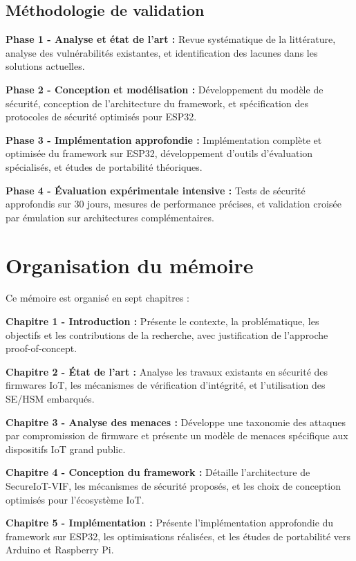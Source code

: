 \subsection{Méthodologie de validation}

\textbf{Phase 1 - Analyse et état de l'art :} Revue systématique de la littérature, analyse des vulnérabilités existantes, et identification des lacunes dans les solutions actuelles.

\textbf{Phase 2 - Conception et modélisation :} Développement du modèle de sécurité, conception de l'architecture du framework, et spécification des protocoles de sécurité optimisés pour ESP32.

\textbf{Phase 3 - Implémentation approfondie :} Implémentation complète et optimisée du framework sur ESP32, développement d'outils d'évaluation spécialisés, et études de portabilité théoriques.

\textbf{Phase 4 - Évaluation expérimentale intensive :} Tests de sécurité approfondis sur 30 jours, mesures de performance précises, et validation croisée par émulation sur architectures complémentaires.

\section{Organisation du mémoire}

Ce mémoire est organisé en sept chapitres :

\textbf{Chapitre 1 - Introduction :} Présente le contexte, la problématique, les objectifs et les contributions de la recherche, avec justification de l'approche proof-of-concept.

\textbf{Chapitre 2 - État de l'art :} Analyse les travaux existants en sécurité des firmwares IoT, les mécanismes de vérification d'intégrité, et l'utilisation des \ac{SE}/\ac{HSM} embarqués.

\textbf{Chapitre 3 - Analyse des menaces :} Développe une taxonomie des attaques par compromission de firmware et présente un modèle de menaces spécifique aux dispositifs IoT grand public.

\textbf{Chapitre 4 - Conception du framework :} Détaille l'architecture de SecureIoT-VIF, les mécanismes de sécurité proposés, et les choix de conception optimisés pour l'écosystème IoT.

\textbf{Chapitre 5 - Implémentation :} Présente l'implémentation approfondie du framework sur ESP32, les optimisations réalisées, et les études de portabilité vers Arduino et Raspberry Pi.

